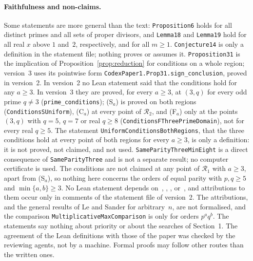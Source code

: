 \documentclass[11pt]{article}
\theoremstyle{remark}
\begin{document}
\paragraph{Faithfulness and non-claims.}
Some statements are more general than the text: \texttt{Proposition6} holds for all
distinct primes and all sets of proper divisors, and \texttt{Lemma18} and
\texttt{Lemma19} hold for all real $x$ above $1$ and~$2$, respectively, and for all
$m\ge1$. \texttt{Conjecture14} is only a definition in the statement file; nothing
proves or assumes it. \texttt{Proposition31} is the implication of
Proposition~\ref{prop:reduction} for conditions on a whole region; version~3 uses its
pointwise form \texttt{CodexPaper1.Prop31.sign\_conclusion}, proved in version~2.
In version~2 no Lean statement said that the conditions hold for any $a\ge3$. In
version~3 they are proved, for every $a\ge3$, at $(3,q)$ for every odd prime $q\ne3$
(\texttt{prime\_conditions}); (S$_a$) is proved on both regions
(\texttt{ConditionsSUniform}), (C$_a$) at every point of $\mathcal R_2$, and
(F$_a$) only at the points $(3,q)$ with $q=5$, $q=7$ or real $q\ge8$
(\texttt{ConditionsFThreePrimeDomain}), not for every real $q\ge5$. The statement
\texttt{UniformConditionsBothRegions}, that the three conditions hold at every point
of both regions for every $a\ge3$, is only a definition: it is not proved, not
claimed, and not used. \texttt{SameParityThreeMinEight} is a direct consequence of
\texttt{SameParityThree} and is not a separate result; no computer certificate is
used. The conditions are not claimed at any point of $\mathcal R_1$ with $a\ge3$,
apart from (S$_a$), so nothing here concerns the orders of equal parity with
$p,q\ge5$ and $\min\{a,b\}\ge3$. No Lean statement depends on~\cite{jy},
\cite{jy2}, \cite{ilic}, \cite{ilicbasic} or~\cite{lesander}, and attributions to
them occur only in comments of the statement file of version~2. The attributions, and the general results of Le
and Sander for arbitrary~$n$, are not formalised, and the comparison
\texttt{MultiplicativeMaxComparison} is only for orders $p^aq^b$. The statements say
nothing about priority or about the searches of Section~1. The agreement of the Lean
definitions with those of the paper was checked by the reviewing agents, not by a
machine. Formal proofs may follow other routes than the written ones.
\end{document}
